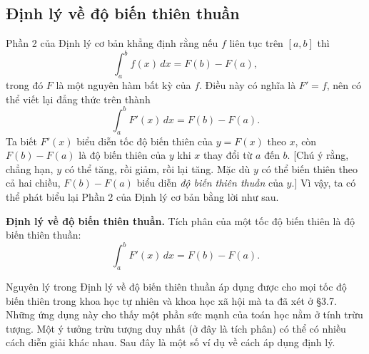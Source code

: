 \documentclass[12pt,a4paper]{article}
\begin{document}
\subsection*{Định lý về độ biến thiên thuần}
Phần 2 của Định lý cơ bản khẳng định rằng nếu $f$ liên tục trên $[a,b]$ thì
\[\int_a^b f(x)\,dx=F(b)-F(a),\]
trong đó $F$ là một nguyên hàm bất kỳ của $f$. Điều này có nghĩa là $F'=f$, nên có thể viết lại đẳng thức trên thành
\[\int_a^b F'(x)\,dx=F(b)-F(a).\]
Ta biết $F'(x)$ biểu diễn tốc độ biến thiên của $y=F(x)$ theo $x$, còn $F(b)-F(a)$ là độ biến thiên của $y$ khi $x$ thay đổi từ $a$ đến $b$. [Chú ý rằng, chẳng hạn, $y$ có thể tăng, rồi giảm, rồi lại tăng. Mặc dù $y$ có thể biến thiên theo cả hai chiều, $F(b)-F(a)$ biểu diễn \textit{độ biến thiên thuần} của $y$.] Vì vậy, ta có thể phát biểu lại Phần 2 của Định lý cơ bản bằng lời như sau.

\noindent\textbf{Định lý về độ biến thiên thuần.} Tích phân của một tốc độ biến thiên là độ biến thiên thuần:
\[\boxed{\displaystyle\int_a^b F'(x)\,dx=F(b)-F(a).}\]

Nguyên lý trong Định lý về độ biến thiên thuần áp dụng được cho mọi tốc độ biến thiên trong khoa học tự nhiên và khoa học xã hội mà ta đã xét ở §3.7. Những ứng dụng này cho thấy một phần sức mạnh của toán học nằm ở tính trừu tượng. Một ý tưởng trừu tượng duy nhất (ở đây là tích phân) có thể có nhiều cách diễn giải khác nhau. Sau đây là một số ví dụ về cách áp dụng định lý.
\end{document}
